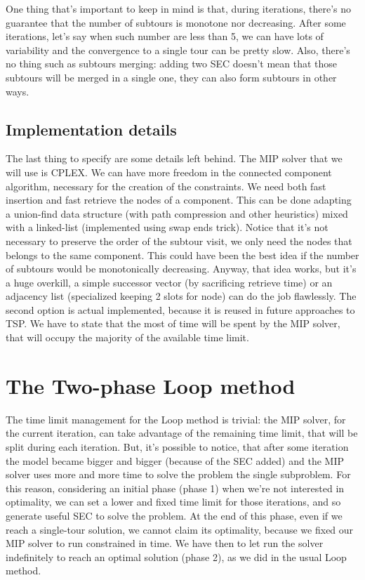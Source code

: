 One thing that's important to keep in mind is that, during iterations, there's
no guarantee that the number of subtours is monotone nor decreasing. After some
iterations, let's say when such number are less than 5, we can have lots of
variability and the convergence to a single tour can be pretty slow. Also,
there's no thing such as subtours merging: adding two SEC doesn't mean that
those subtours will be merged in a single one, they can also form subtours in
other ways.

\subsection{Implementation details}
The last thing to specify are some details left behind. The MIP solver
that we will use is CPLEX. We can have more freedom in the connected component
algorithm, necessary for the creation of the constraints. We need both fast
insertion and fast retrieve the nodes of a component. This can be done adapting
a union-find data structure (with path compression and other heuristics) mixed
with a linked-list (implemented using swap ends trick). Notice that it's not
necessary to preserve the order of the subtour visit, we only need the nodes
that belongs to the same component. This could have been the best idea if the
number of subtours would be monotonically decreasing. Anyway, that idea works,
but it's a huge overkill, a simple successor vector (by sacrificing retrieve
time) or an adjacency list (specialized keeping 2 slots for node) can do the job
flawlessly. The second option is actual implemented, because it is reused in
future approaches to TSP. We have to state that the most of time will be spent
by the MIP solver, that will occupy the majority of the  available time limit.

\section{The Two-phase Loop method}
The time limit management for the Loop method is trivial: the MIP solver, for
the current iteration, can take advantage of the remaining time limit, that
will be split during each iteration. But, it's possible to notice, that after
some iteration the model became bigger and bigger (because of the SEC added)
and the MIP solver uses more and more time to solve the problem the single
subproblem. For this reason, considering an initial phase (phase 1) when we're
not interested in optimality, we can set a lower and fixed time limit for those
iterations, and so generate useful SEC to solve the problem. At the end of this
phase, even if we reach a single-tour solution, we cannot claim its optimality,
because we fixed our MIP solver to run constrained in time. We have then to let
run the solver indefinitely to reach an optimal solution (phase 2), as we did in
the usual Loop method. 

